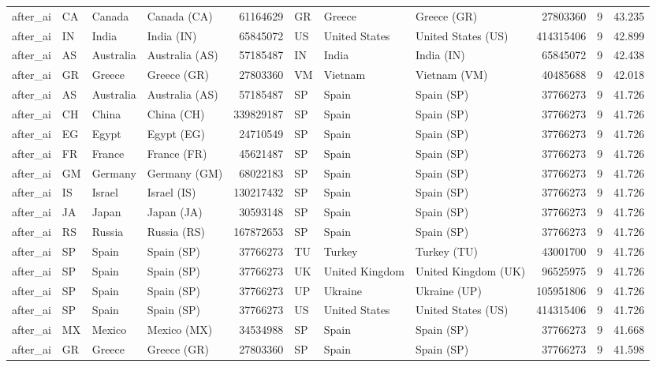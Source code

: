 \begin{tabular}{llllrlllrrr}
after\_ai & CA & Canada & Canada (CA) & 61164629 & GR & Greece & Greece (GR) & 27803360 & 9 & 43.235 \\
after\_ai & IN & India & India (IN) & 65845072 & US & United States & United States (US) & 414315406 & 9 & 42.899 \\
after\_ai & AS & Australia & Australia (AS) & 57185487 & IN & India & India (IN) & 65845072 & 9 & 42.438 \\
after\_ai & GR & Greece & Greece (GR) & 27803360 & VM & Vietnam & Vietnam (VM) & 40485688 & 9 & 42.018 \\
after\_ai & AS & Australia & Australia (AS) & 57185487 & SP & Spain & Spain (SP) & 37766273 & 9 & 41.726 \\
after\_ai & CH & China & China (CH) & 339829187 & SP & Spain & Spain (SP) & 37766273 & 9 & 41.726 \\
after\_ai & EG & Egypt & Egypt (EG) & 24710549 & SP & Spain & Spain (SP) & 37766273 & 9 & 41.726 \\
after\_ai & FR & France & France (FR) & 45621487 & SP & Spain & Spain (SP) & 37766273 & 9 & 41.726 \\
after\_ai & GM & Germany & Germany (GM) & 68022183 & SP & Spain & Spain (SP) & 37766273 & 9 & 41.726 \\
after\_ai & IS & Israel & Israel (IS) & 130217432 & SP & Spain & Spain (SP) & 37766273 & 9 & 41.726 \\
after\_ai & JA & Japan & Japan (JA) & 30593148 & SP & Spain & Spain (SP) & 37766273 & 9 & 41.726 \\
after\_ai & RS & Russia & Russia (RS) & 167872653 & SP & Spain & Spain (SP) & 37766273 & 9 & 41.726 \\
after\_ai & SP & Spain & Spain (SP) & 37766273 & TU & Turkey & Turkey (TU) & 43001700 & 9 & 41.726 \\
after\_ai & SP & Spain & Spain (SP) & 37766273 & UK & United Kingdom & United Kingdom (UK) & 96525975 & 9 & 41.726 \\
after\_ai & SP & Spain & Spain (SP) & 37766273 & UP & Ukraine & Ukraine (UP) & 105951806 & 9 & 41.726 \\
after\_ai & SP & Spain & Spain (SP) & 37766273 & US & United States & United States (US) & 414315406 & 9 & 41.726 \\
after\_ai & MX & Mexico & Mexico (MX) & 34534988 & SP & Spain & Spain (SP) & 37766273 & 9 & 41.668 \\
after\_ai & GR & Greece & Greece (GR) & 27803360 & SP & Spain & Spain (SP) & 37766273 & 9 & 41.598 \\

\end{tabular}
